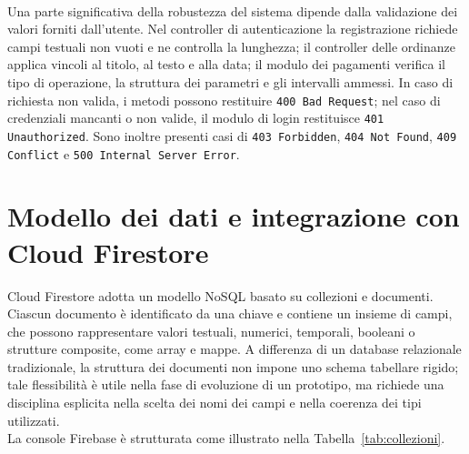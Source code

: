 \\
Una parte significativa della robustezza del sistema dipende dalla validazione dei valori forniti dall'utente. Nel controller di autenticazione la registrazione richiede campi testuali non vuoti e ne controlla la lunghezza; il controller delle ordinanze applica vincoli al titolo, al testo e alla data; il modulo dei pagamenti verifica il tipo di operazione, la struttura dei parametri e gli intervalli ammessi. In caso di richiesta non valida, i metodi possono restituire \texttt{400 Bad Request}; nel caso di credenziali mancanti o non valide, il modulo di login restituisce \texttt{401 Unauthorized}. Sono inoltre presenti casi di \texttt{403 Forbidden}, \texttt{404 Not Found}, \texttt{409 Conflict} e \texttt{500 Internal Server Error}.

\section{Modello dei dati e integrazione con Cloud Firestore}

Cloud Firestore adotta un modello NoSQL basato su collezioni e documenti. Ciascun documento è identificato da una chiave e contiene un insieme di campi, che possono rappresentare valori testuali, numerici, temporali, booleani o strutture composite, come array e mappe. A differenza di un database relazionale tradizionale, la struttura dei documenti non impone uno schema tabellare rigido; tale flessibilità è utile nella fase di evoluzione di un prototipo, ma richiede una disciplina esplicita nella scelta dei nomi dei campi e nella coerenza dei tipi utilizzati.
\\
La console Firebase è strutturata come illustrato nella Tabella~\ref{tab:collezioni}.
\begingroup
\small
\setlength{\tabcolsep}{4pt}
\renewcommand{\arraystretch}{1.15}

